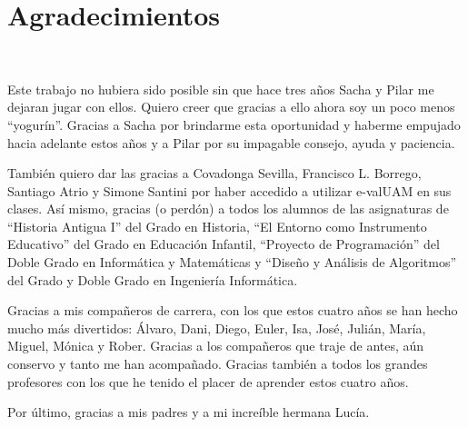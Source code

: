\chapter*{Agradecimientos}
~

Este trabajo no hubiera sido posible sin que hace tres años Sacha y Pilar me dejaran jugar con ellos. Quiero creer que gracias a ello ahora soy un poco menos ``yogurín''. Gracias a Sacha por brindarme esta oportunidad y haberme empujado hacia adelante estos años y a Pilar por su impagable consejo, ayuda y paciencia.

También quiero dar las gracias a Covadonga Sevilla, Francisco L. Borrego, Santiago Atrio y Simone Santini por haber accedido a utilizar e-valUAM en sus clases. Así mismo, gracias (o perdón) a todos los alumnos de las asignaturas de ``Historia Antigua I'' del Grado en Historia, ``El Entorno como Instrumento Educativo'' del Grado en Educación Infantil, ``Proyecto de Programación'' del Doble Grado en Informática y Matemáticas y ``Diseño y Análisis de Algoritmos'' del Grado y Doble Grado en Ingeniería Informática.

Gracias a mis compañeros de carrera, con los que estos cuatro años se han hecho mucho más divertidos: Álvaro, Dani, Diego, Euler, Isa, José, Julián, María, Miguel, Mónica y Rober. Gracias a los compañeros que traje de antes, aún conservo y tanto me han acompañado. Gracias también a todos los grandes profesores con los que he tenido el placer de aprender estos cuatro años.

Por último, gracias a mis padres y a mi increíble hermana Lucía.




